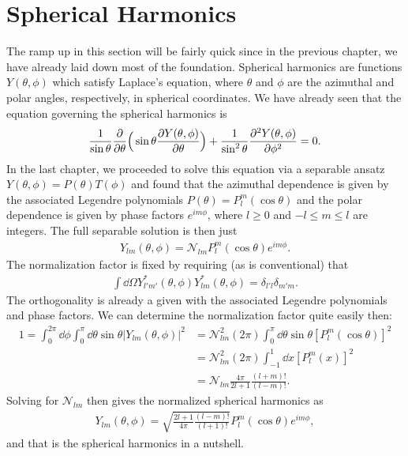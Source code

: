 \chapter{Spherical Harmonics}

The ramp up in this section will be fairly quick since in the previous chapter, we have already laid down most of the foundation.
Spherical harmonics are functions $Y(\theta,\phi)$ which satisfy Laplace's equation, where $\theta$ and $\phi$ are the azimuthal and polar angles, respectively, in spherical coordinates.
We have already seen that the equation governing the spherical harmonics is
\begin{eqnarray}
    \frac{1}{\sin{\theta}} \pdv{\theta} \Big( \sin{\theta} \pdv{Y(\theta,\phi)}{\theta} \Big) + \frac{1}{\sin^2{\theta}} \pdv[2]{Y(\theta,\phi)}{\phi} = 0
.\end{eqnarray}
In the last chapter, we proceeded to solve this equation via a separable ansatz $Y(\theta,\phi) = P(\theta) T(\phi)$ and found that the azimuthal dependence is given by the associated Legendre polynomials $P(\theta) = P_{l}^{m}(\cos{\theta})$ and the polar dependence is given by phase factors $e^{i m \phi}$, where $l \geq 0$ and $-l \leq m \leq l$ are integers.
The full separable solution is then just
\begin{eqnarray}
    Y_{lm}(\theta,\phi) = \mathcal{N}_{lm} P_{l}^{m}(\cos{\theta}) e^{im\phi}
.\end{eqnarray}
The normalization factor is fixed by requiring (as is conventional) that
\begin{eqnarray}
    \int \dd{\Omega} Y_{l'm'}^{*}(\theta,\phi) Y_{lm}^{*}(\theta,\phi) = \delta_{l'l} \delta_{m'm}
.\end{eqnarray}
The orthogonality is already a given with the associated Legendre polynomials and phase factors.
We can determine the normalization factor quite easily then:
\begin{align}
    1 = \int_{0}^{2\pi} \dd{\phi} \int_{0}^{\pi} \dd{\theta} \sin{\theta} |Y_{lm}(\theta,\phi)|^2 &= \mathcal{N}_{lm}^2 (2 \pi) \int_{0}^{\pi} \dd{\theta} \sin{\theta} [P_{l}^{m}(\cos{\theta})]^2 \nonumber \\
                                                                                              &= \mathcal{N}_{lm}^2 (2 \pi) \int_{-1}^{1} \dd{x} [ P_{l}^{m}(x) ]^2 \nonumber \\
                                                                                              &= \mathcal{N}_{lm} \frac{4 \pi}{2l+1} \frac{(l+m)!}{(l-m)!}
.\end{align}
Solving for $\mathcal{N}_{lm}$ then gives the normalized spherical harmonics as
\begin{eqnarray}
    Y_{lm}(\theta,\phi) = \sqrt{\frac{2l+1}{4 \pi} \frac{(l-m)!}{(l+1)!}} P_{l}^{m}(\cos{\theta}) e^{im\phi}
,\end{eqnarray}
and that is the spherical harmonics in a nutshell.







